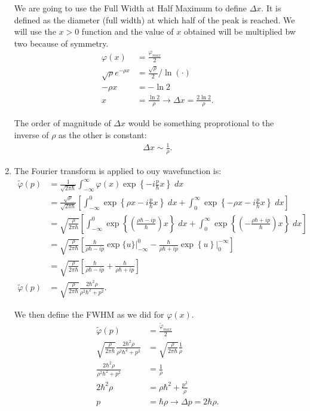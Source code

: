 \documentclass[letterpaper,11pt,twoside]{article}
\begin{document}
\begin{enumerate}[itemsep=0pt,topsep=0pt,label=(\alph*)]
  We are going to use the Full Width at Half Maximum to define $\Delta x$. It is defined as the diameter (full width) at which 
  half of the peak is reached. We will use the $x>0$ function and the value of $x$ obtained will be multiplied bw two because of symmetry.
  \begin{align*}
    \varphi(x)&=\frac{\varphi_{max}}{2}\\
    \sqrt{\rho}e^{-\rho x}&=\frac{\sqrt{\rho}}{2}\biggr/\ln(\cdot)\\
    -\rho x&=-\ln2\\
    x&=\frac{\ln2}{\rho}\longrightarrow \Delta x=\frac{2\ln2}{\rho}.
  \end{align*}

  The order of magnitude of $\Delta x$ would be something proprotional to the inverse of $\rho$ as the other is constant:
  \begin{align*}
    \Delta x\sim\frac{1}{\rho}.
  \end{align*}

  \item The Fourier transform is applied to ouy wavefunction is:
  \begin{align*}
    \tilde{\varphi}(p)&=\frac{1}{\sqrt{2\pi\hbar}}\int_{-\infty}^\infty \varphi(x)\exp\left\{-i\frac{p}{\hbar}x\right\}\;dx\\
    &=\frac{\sqrt{\rho}}{\sqrt{2\pi\hbar}}\left[\int_{-\infty}^0\exp\left\{\rho x-i\frac{p}{\hbar}x\right\}\;dx+\int_0^\infty \exp\left\{-\rho x-i\frac{p}{\hbar}x\right\}\;dx\right]\\
    &=\sqrt{\frac{\rho}{2\pi\hbar}}\left[\int_{-\infty}^0\exp\left\{\left(\frac{\rho\hbar-ip}{\hbar}\right)x\right\}\;dx+\int_0^\infty \exp\left\{\left(-\frac{\rho\hbar+ip}{\hbar}\right)x\right\}\;dx\right]\\
    &=\sqrt{\frac{\rho}{2\pi\hbar}}\left[\frac{\hbar}{\rho\hbar-ip}\exp\{u\}\biggr|_{-\infty}^0-\frac{\hbar}{\rho\hbar+ip}\exp\left\{u\right\}\biggr|_0^{-\infty}\right]\\
    &=\sqrt{\frac{\rho}{2\pi\hbar}}\left[\frac{\hbar}{\rho\hbar-ip}+\frac{\hbar}{\rho\hbar+ip}\right]\\
    \tilde{\varphi}(p)&=\sqrt{\frac{\rho}{2\pi\hbar}}\frac{2\hbar^2\rho}{\rho^2\hbar^2+p^2}.
  \end{align*}

  We then define the FWHM as we did for $\varphi(x)$.
  \begin{align*}
    \tilde{\varphi}(p)&=\frac{\tilde{\varphi}_{max}}{2}\\
    \sqrt{\frac{\rho}{2\pi\hbar}}\frac{2\hbar^2\rho}{\rho^2\hbar^2+p^2}&=\sqrt{\frac{\rho}{2\pi\hbar}}\frac{1}{\rho}\\
    \frac{2\hbar^2\rho}{\rho^2\hbar^2+p^2}&=\frac{1}{\rho}\\
    2\hbar^2\rho&=\rho\hbar^2+\frac{p^2}{\rho}\\
    p&=\hbar\rho\longrightarrow\Delta p=2\hbar\rho.
  \end{align*}


\end{enumerate}
\end{document}
